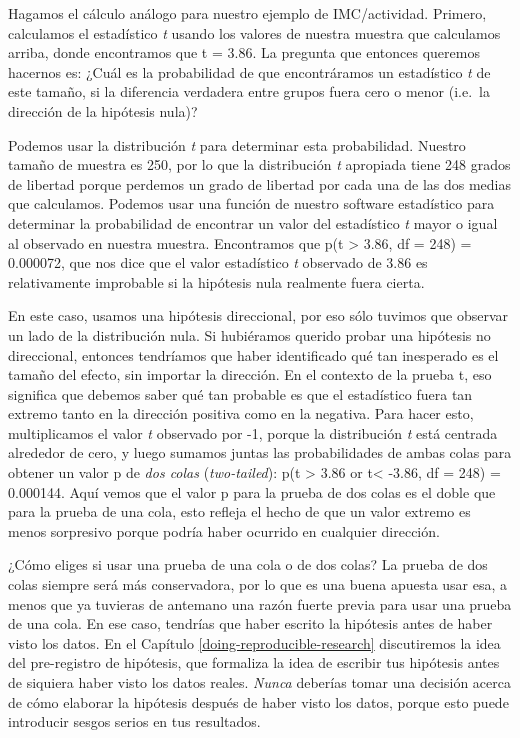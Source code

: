 \documentclass[
  12pt,
]{book}
\begin{document}
Hagamos el cálculo análogo para nuestro ejemplo de IMC/actividad. Primero, calculamos el estadístico \emph{t} usando los valores de nuestra muestra que calculamos arriba, donde encontramos que t = 3.86. La pregunta que entonces queremos hacernos es: ¿Cuál es la probabilidad de que encontráramos un estadístico \emph{t} de este tamaño, si la diferencia verdadera entre grupos fuera cero o menor (i.e.~la dirección de la hipótesis nula)?

Podemos usar la distribución \emph{t} para determinar esta probabilidad. Nuestro tamaño de muestra es 250, por lo que la distribución \emph{t} apropiada tiene 248 grados de libertad porque perdemos un grado de libertad por cada una de las dos medias que calculamos. Podemos usar una función de nuestro software estadístico para determinar la probabilidad de encontrar un valor del estadístico \emph{t} mayor o igual al observado en nuestra muestra. Encontramos que p(t \textgreater{} 3.86, df = 248) = 0.000072, que nos dice que el valor estadístico \emph{t} observado de 3.86 es relativamente improbable si la hipótesis nula realmente fuera cierta.

En este caso, usamos una hipótesis direccional, por eso sólo tuvimos que observar un lado de la distribución nula. Si hubiéramos querido probar una hipótesis no direccional, entonces tendríamos que haber identificado qué tan inesperado es el tamaño del efecto, sin importar la dirección. En el contexto de la prueba t, eso significa que debemos saber qué tan probable es que el estadístico fuera tan extremo tanto en la dirección positiva como en la negativa. Para hacer esto, multiplicamos el valor \emph{t} observado por -1, porque la distribución \emph{t} está centrada alrededor de cero, y luego sumamos juntas las probabilidades de ambas colas para obtener un valor p de \emph{dos colas} (\emph{two-tailed}): p(t \textgreater{} 3.86 or t\textless{} -3.86, df = 248) = 0.000144. Aquí vemos que el valor p para la prueba de dos colas es el doble que para la prueba de una cola, esto refleja el hecho de que un valor extremo es menos sorpresivo porque podría haber ocurrido en cualquier dirección.

¿Cómo eliges si usar una prueba de una cola o de dos colas? La prueba de dos colas siempre será más conservadora, por lo que es una buena apuesta usar esa, a menos que ya tuvieras de antemano una razón fuerte previa para usar una prueba de una cola. En ese caso, tendrías que haber escrito la hipótesis antes de haber visto los datos. En el Capítulo \ref{doing-reproducible-research} discutiremos la idea del pre-registro de hipótesis, que formaliza la idea de escribir tus hipótesis antes de siquiera haber visto los datos reales. \emph{Nunca} deberías tomar una decisión acerca de cómo elaborar la hipótesis después de haber visto los datos, porque esto puede introducir sesgos serios en tus resultados.
\end{document}
